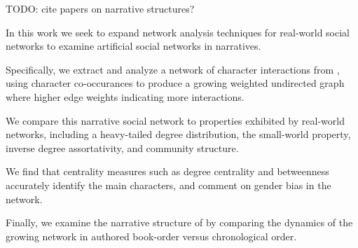 TODO: cite papers on narrative structures? 

In this work we seek to expand network analysis techniques for real-world social networks to examine artificial social networks in narratives.

Specifically, we extract and analyze a network of character interactions from \infinitejest, using character co-occurances to produce a growing weighted undirected graph where higher edge weights indicating more interactions.

We compare this narrative social network to properties exhibited by real-world networks, including a heavy-tailed degree distribution, the small-world property, inverse degree assortativity, and community structure.

We find that centrality measures such as degree centrality and betweenness accurately identify the main characters, and comment on gender bias in the network.

Finally, we examine the narrative structure of \infinitejest by comparing the dynamics of the growing network in authored book-order versus chronological order.

